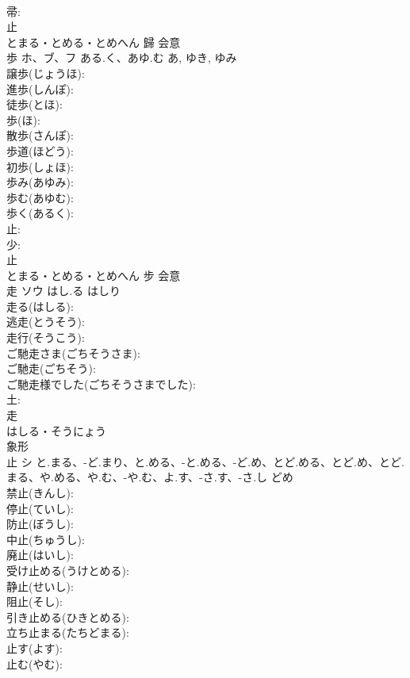 \documentclass[8pt]{extreport}
\begin{document}
\begin{CJK}{UTF8}{min}
\\	帚: 
\\	止	
\\	とまる・とめる・とめへん	歸	会意 
\\	歩	ホ、ブ、フ	ある.く、あゆ.む	あ, ゆき, ゆみ	
\\	譲歩(じょうほ): 
\\	進歩(しんぽ): 
\\	徒歩(とほ): 
\\	歩(ほ): 
\\	散歩(さんぽ): 
\\	歩道(ほどう): 
\\	初歩(しょほ): 
\\	歩み(あゆみ): 
\\	歩む(あゆむ): 
\\	歩く(あるく): 
\\	止: 
\\	少: 
\\	止	
\\	とまる・とめる・とめへん	步	会意 
\\	走	ソウ	はし.る	はしり	
\\	走る(はしる): 
\\	逃走(とうそう): 
\\	走行(そうこう): 
\\	ご馳走さま(ごちそうさま): 
\\	ご馳走(ごちそう): 
\\	ご馳走様でした(ごちそうさまでした): 
\\	土: 
\\	走	
\\	はしる・そうにょう	
\\	象形 
\\	止	シ	と.まる、-ど.まり、と.める、-と.める、-ど.め、とど.める、とど.め、とど.まる、や.める、や.む、-や.む、よ.す、-さ.す、-さ.し	どめ	
\\	禁止(きんし): 
\\	停止(ていし): 
\\	防止(ぼうし): 
\\	中止(ちゅうし): 
\\	廃止(はいし): 
\\	受け止める(うけとめる): 
\\	静止(せいし): 
\\	阻止(そし): 
\\	引き止める(ひきとめる): 
\\	立ち止まる(たちどまる): 
\\	止す(よす): 
\\	止む(やむ): 

\end{CJK}
\end{document}
